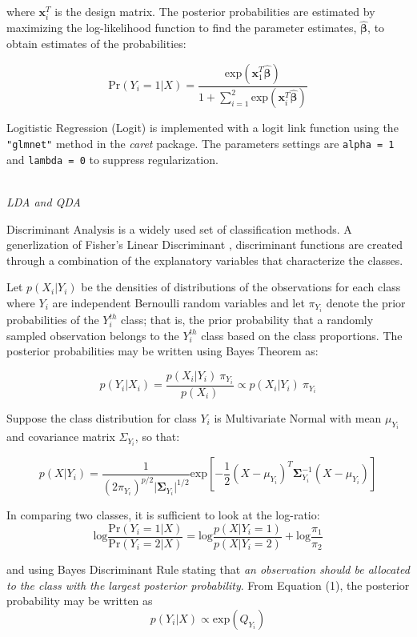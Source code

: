 \documentclass[12pt,]{article}
\begin{document}
where \(\mathbf{x}^T_i\) is the design matrix. The posterior
probabilities are estimated by maximizing the log-likelihood function to
find the parameter estimates, \(\hat{\boldsymbol{\beta}}\), to obtain
estimates of the probabilities:

\[
\text{Pr}(Y_i=1 \vert X) = \frac{ \text{exp}(\mathbf{x}^T_1 \hat{\boldsymbol{\beta}}) }{ 1 + \sum^2_{i=1} \text{exp}(\mathbf{x}^T_i \hat{\boldsymbol{\beta}}) }
\]

Logitistic Regression (Logit) is implemented with a logit link function
using the \texttt{"glmnet"} method in the \emph{caret} package. The
parameters settings are \texttt{alpha\ =\ 1} and \texttt{lambda\ =\ 0}
to suppress regularization.

\(~\)\\
\emph{LDA and QDA}

Discriminant Analysis is a widely used set of classification methods. A
generlization of Fisher's Linear Discriminant
\autocite{fisher_use_1936}, discriminant functions are created through a
combination of the explanatory variables that characterize the classes.

Let \(p(X_i \vert Y_i)\) be the densities of distributions of the
observations for each class where \(Y_i\) are independent Bernoulli
random variables and let \(\pi_{Y_i}\) denote the prior probabilities of
the \(Y^{th}_i\) class; that is, the prior probability that a randomly
sampled observation belongs to the \(Y_i^{th}\) class based on the class
proportions. The posterior probabilities may be written using Bayes
Theorem as:

\[
p(Y_i \vert X_i) = \frac{p(X_i \vert Y_i) ~\pi_{Y_i}}{p(X_i)} \propto p(X_i \vert Y_i) ~\pi_{Y_i}   \tag{1}
\]

Suppose the class distribution for class \(Y_i\) is Multivariate Normal
with mean \(\mu_{Y_i}\) and covariance matrix \(\Sigma_{Y_i}\), so that:

\[
p(X \vert Y_i) = \frac{1}{(2 \pi_{Y_i})^{p/2} \vert\boldsymbol{\Sigma}_{Y_i} \vert ^{1/2}} \text{exp} \left[-\frac{1}{2}(X - \mu_{Y_i})^T \boldsymbol{\Sigma}^{-1}_{Y_i}(X - \mu_{Y_i})  \right]  \tag{2}
\]

In comparing two classes, it is sufficient to look at the log-ratio: \[
\text{log} \frac{\text{Pr}(Y_i=1 \vert X)}{\text{Pr}(Y_i=2 \vert X)} = \text{log}\frac{p(X \vert Y_i=1)}{p(X \vert Y_i=2)} + \text{log}\frac{\pi_1}{\pi_2}   \tag{3}
\]

and using Bayes Discriminant Rule stating that \emph{an observation
should be allocated to the class with the largest posterior
probability}. From Equation (1), the posterior probability may be
written as \[
p(Y_i \vert X) \propto \text{exp} \left( Q_{Y_i} \right)    \tag{4}
\]
\end{document}
